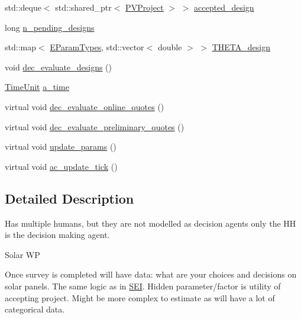 \begin{DoxyCompactItemize}
\item 
std\+::deque$<$ std\+::shared\+\_\+ptr$<$ \hyperlink{classsolar__core_1_1_p_v_project}{P\+V\+Project} $>$ $>$ \hyperlink{classsolar__core_1_1_household_ad4409e81251bdd33d9dca1cd1225dc75}{accepted\+\_\+design}
\item 
long \hyperlink{classsolar__core_1_1_household_ac82a6ebca38ecaf971845f6fa5791559}{n\+\_\+pending\+\_\+designs}
\item 
std\+::map$<$ \hyperlink{namespacesolar__core_aa1147341e5ef7a40d68d1bd68e149362}{E\+Param\+Types}, std\+::vector$<$ double $>$ $>$ \hyperlink{classsolar__core_1_1_household_a7c0f5fb9f84a1d971e770fc677e7d8de}{T\+H\+E\+T\+A\+\_\+design}
\item 
void \hyperlink{classsolar__core_1_1_household_aaa1f1e52009d8aef32d3c5a9367b93b7}{dec\+\_\+evaluate\+\_\+designs} ()
\end{DoxyCompactItemize}
\begin{DoxyCompactItemize}
\item 
\hyperlink{namespacesolar__core_a4b5949d07259da6f8a20d12a30403e90}{Time\+Unit} \hyperlink{classsolar__core_1_1_household_ad323100235079f34537ccda656e86e64}{a\+\_\+time}
\item 
virtual void \hyperlink{classsolar__core_1_1_household_a2d8c80f6db68610fb3e0f9b48e1e490b}{dec\+\_\+evaluate\+\_\+online\+\_\+quotes} ()
\item 
virtual void \hyperlink{classsolar__core_1_1_household_a6e27e36f623bd307eedcd97c550d5c5e}{dec\+\_\+evaluate\+\_\+preliminary\+\_\+quotes} ()
\item 
virtual void \hyperlink{classsolar__core_1_1_household_a733a90456d57f698b3aa974c6c6e0108}{update\+\_\+params} ()
\item 
virtual void \hyperlink{classsolar__core_1_1_household_ac73de13d0d4b4e01b2defbb85872c4b2}{ac\+\_\+update\+\_\+tick} ()
\end{DoxyCompactItemize}


\subsection{Detailed Description}
Has multiple humans, but they are not modelled as decision agents only the H\+H is the decision making agent.

\begin{DoxyRefDesc}{Solar W\+P}
\item[\hyperlink{wp__wp000001}{Solar W\+P}]Once survey is completed will have data\+: what are your choices and decisions on solar panels. The same logic as in \hyperlink{classsolar__core_1_1_s_e_i}{S\+E\+I}. Hidden parameter/factor is utility of accepting project. Might be more complex to estimate as will have a lot of categorical data.\end{DoxyRefDesc}


